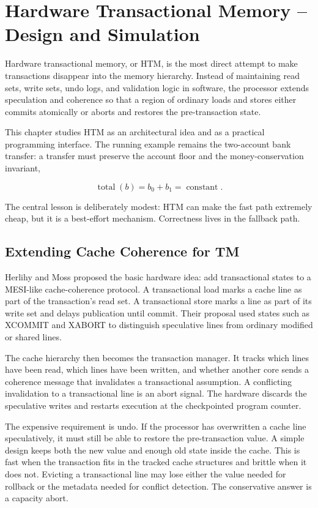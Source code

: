 \chapter{Hardware Transactional Memory – Design and Simulation}

Hardware transactional memory, or HTM, is the most direct attempt to make transactions disappear into the memory hierarchy. Instead of maintaining read sets, write sets, undo logs, and validation logic in software, the processor extends speculation and coherence so that a region of ordinary loads and stores either commits atomically or aborts and restores the pre-transaction state.

This chapter studies HTM as an architectural idea and as a practical programming interface. The running example remains the two-account bank transfer: a transfer must preserve the account floor and the money-conservation invariant,

$$
\operatorname{total}(b)=b_0+b_1=\operatorname{constant}.
$$

The central lesson is deliberately modest: HTM can make the fast path extremely cheap, but it is a best-effort mechanism. Correctness lives in the fallback path.

\section{Extending Cache Coherence for TM}

Herlihy and Moss proposed the basic hardware idea: add transactional states to a MESI-like cache-coherence protocol. A transactional load marks a cache line as part of the transaction's read set. A transactional store marks a line as part of its write set and delays publication until commit. Their proposal used states such as XCOMMIT and XABORT to distinguish speculative lines from ordinary modified or shared lines.

The cache hierarchy then becomes the transaction manager. It tracks which lines have been read, which lines have been written, and whether another core sends a coherence message that invalidates a transactional assumption. A conflicting invalidation to a transactional line is an abort signal. The hardware discards the speculative writes and restarts execution at the checkpointed program counter.

The expensive requirement is undo. If the processor has overwritten a cache line speculatively, it must still be able to restore the pre-transaction value. A simple design keeps both the new value and enough old state inside the cache. This is fast when the transaction fits in the tracked cache structures and brittle when it does not. Evicting a transactional line may lose either the value needed for rollback or the metadata needed for conflict detection. The conservative answer is a capacity abort.

